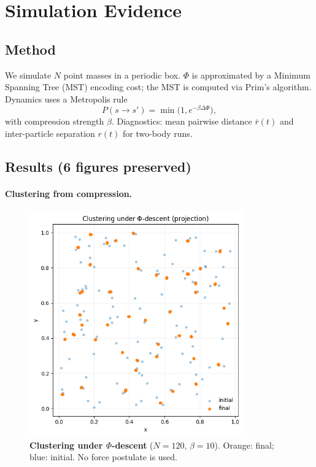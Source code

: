 \documentclass[aps,preprint,onecolumn,longbibliography,nofootinbib]{revtex4-2}
\numberwithin{equation}{section}
\begin{document}
\section{Simulation Evidence}
\subsection{Method}
We simulate $N$ point masses in a periodic box. $\Phi$ is approximated by a Minimum Spanning Tree (MST) encoding cost; the MST is computed via Prim's algorithm. Dynamics uses a Metropolis rule
\begin{equation}
P(s\to s')=\min\!\big(1,e^{-\beta\Delta\Phi}\big), \label{eq:metro}
\end{equation}
with compression strength $\beta$. Diagnostics: mean pairwise distance $\bar r(t)$ and inter-particle separation $r(t)$ for two-body runs.

\subsection{Results (6 figures preserved)}
\paragraph*{Clustering from compression.}
\begin{figure}[H]
\centering
\includegraphics[width=0.82\textwidth]{figures/clustering.png}
\caption{\textbf{Clustering under $\Phi$-descent} ($N{=}120$, $\beta{=}10$). Orange: final; blue: initial. No force postulate is used.}
\label{fig:clustering}
\end{figure}
\end{document}
